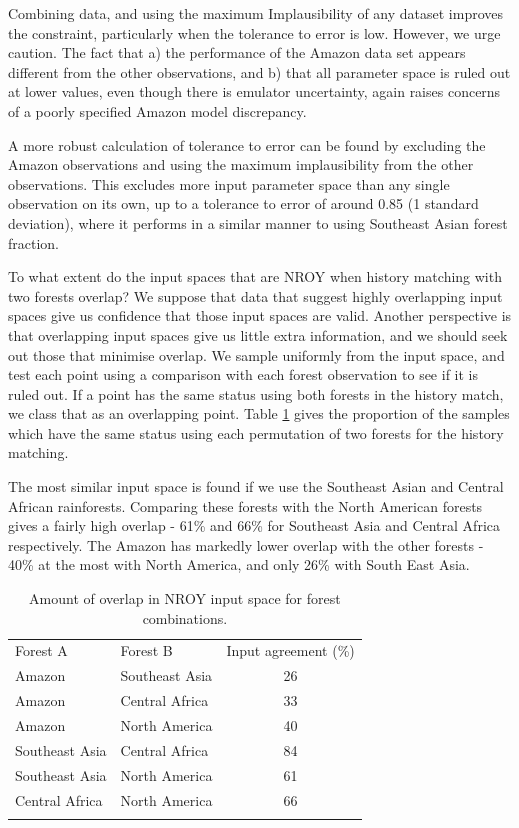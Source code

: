 \documentclass[esd, article]{copernicus} %
\begin{document}
Combining data, and using the maximum Implausibility of any dataset improves the constraint, particularly when the tolerance to error is low. However, we urge caution. The fact that a) the performance of the Amazon data set appears different from the other observations, and b) that all parameter space is ruled out at lower values, even though there is emulator uncertainty, again raises concerns of a poorly specified Amazon model discrepancy. 

A more robust calculation of tolerance to error can be found by excluding the Amazon observations and using the maximum implausibility from the other observations. This excludes more input parameter space than any single observation on its own, up to a tolerance to error of around 0.85 (1 standard deviation), where it performs in a similar manner to using Southeast Asian forest fraction.
 

To what extent do the input spaces that are NROY when history matching with two forests overlap? We suppose that data that suggest highly overlapping input spaces give us confidence that those input spaces are valid. Another perspective is that overlapping input spaces give us little extra information, and we should seek out those that minimise overlap. We sample uniformly from the input space, and test each point using a comparison with each forest observation to see if it is ruled out. If a point has the same status using both forests in the history match, we class that as an overlapping point. Table \ref{tab:input_overlap} gives the proportion of the samples which have the same status using each permutation of two forests for the history matching.

The most similar input space is found if we use the Southeast Asian and Central African rainforests. Comparing these forests with the North American forests gives a fairly high overlap - 61\% and 66\% for Southeast Asia and Central Africa respectively. The Amazon has markedly lower overlap with the other forests - 40\% at the most with North America, and only 26\% with South East Asia.


\begin{table}[t]
\caption{Amount of overlap in NROY input space for forest combinations.}\label{tab:input_overlap}
\begin{tabular}{llc}

\tophline
Forest A &  Forest B & Input agreement (\%) \\
Amazon & Southeast Asia & 26 \\
Amazon & Central Africa & 33 \\
Amazon & North America & 40 \\
Southeast Asia & Central Africa & 84 \\
Southeast Asia & North America & 61 \\
Central Africa  & North America & 66 \\
\bottomhline
\end{tabular}
\belowtable{} %
\end{table}
\end{document}
